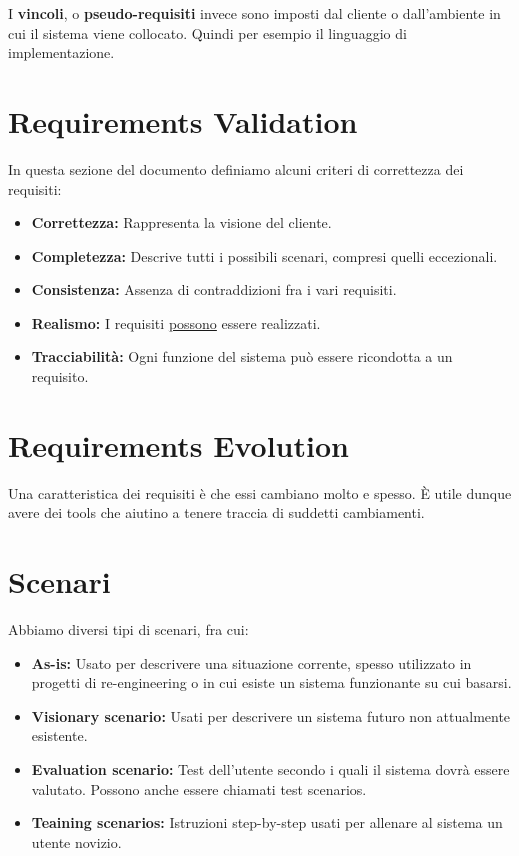     I \textbf{vincoli}, o \textbf{pseudo-requisiti} invece sono imposti dal cliente o dall'ambiente in cui il sistema viene collocato. Quindi per esempio il linguaggio di implementazione.
    
\section{Requirements Validation}

    In questa sezione del documento definiamo alcuni criteri di correttezza dei requisiti:
    
    \begin{itemize}
        \item \textbf{Correttezza:} Rappresenta la visione del cliente.
        \item \textbf{Completezza:} Descrive tutti i possibili scenari, compresi quelli eccezionali.
        \item \textbf{Consistenza:} Assenza di contraddizioni fra i vari requisiti.
        \item \textbf{Realismo:} I requisiti \underline{possono} essere realizzati.
        \item \textbf{Tracciabilità:} Ogni funzione del sistema può essere ricondotta a un requisito.
    \end{itemize}
    
\section{Requirements Evolution}
    Una caratteristica dei requisiti è che essi cambiano molto e spesso. È utile dunque avere dei tools che aiutino a tenere traccia di suddetti cambiamenti.
    
\section{Scenari}

    Abbiamo diversi tipi di scenari, fra cui:
    \begin{itemize}
        \item \textbf{As-is:} Usato per descrivere una situazione corrente, spesso utilizzato in progetti di re-engineering o in cui esiste un sistema funzionante su cui basarsi.
        \item \textbf{Visionary scenario:} Usati per descrivere un sistema futuro non attualmente esistente.
        \item \textbf{Evaluation scenario:} Test dell'utente secondo i quali il sistema dovrà essere valutato. Possono anche essere chiamati test scenarios.
        \item \textbf{Teaining scenarios:} Istruzioni step-by-step usati per allenare al sistema un utente novizio.
    \end{itemize}
    
